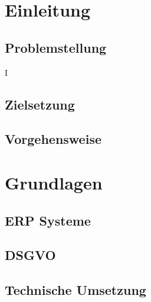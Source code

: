 \documentclass{report}
\begin{document}
\maketitle
\tableofcontents
\section{Einleitung}
\subsection{Problemstellung}
I\subsection{Zielsetzung}
\subsection{Vorgehensweise}
\section{Grundlagen}
\subsection{ERP Systeme}
\subsection{DSGVO}

\subsection{Technische Umsetzung}
\end{document}
